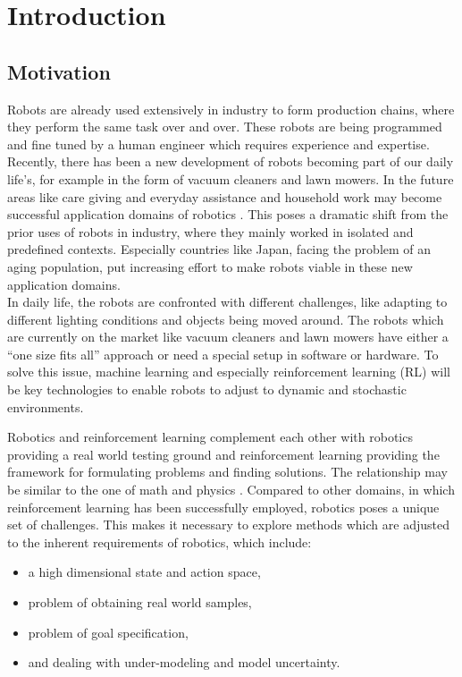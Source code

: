 
\chapter{Introduction}

\section{Motivation}
Robots are already used extensively in industry to form production chains,
where they perform the same task over and over.
These robots are being programmed and fine tuned
by a human engineer which requires experience and expertise. \\
Recently, there has been a new development of robots
becoming part of our daily life's, for example in the form of 
vacuum cleaners and lawn mowers. In the future areas like care giving and
everyday assistance and household work may become successful
application domains
of robotics \citep{schaal2007new}.
This poses a dramatic shift from the prior uses of robots in industry, where
they mainly worked in isolated and predefined contexts.
Especially countries like Japan, facing the problem of an
aging population, put increasing effort to make robots
viable in these new application domains.  \\
In daily life, the robots are confronted with different challenges,
like adapting to different lighting conditions and
objects being moved around.
The robots which are currently on the market
like vacuum cleaners and lawn mowers have
either a ``one size fits all'' approach or need a special setup
in software or hardware. To solve this issue,
machine learning and especially
reinforcement learning (RL) will be key technologies to enable robots
to adjust to dynamic and stochastic environments.

Robotics and reinforcement learning complement each other
with robotics providing a real world testing ground and
reinforcement learning providing
the framework for formulating problems and finding solutions. The 
relationship may be similar to the one of  math and physics
\citep{kober2013reinforcement}. 
Compared to other domains, in which reinforcement learning has been
successfully employed,
robotics poses a unique set of challenges. This makes
it necessary to explore methods which are adjusted to the inherent
requirements of robotics, which include:

\begin{itemize}
\item a high dimensional state and action space,
\item problem of obtaining real world samples,
\item problem of goal specification,
\item and dealing with under-modeling and model uncertainty.
\end{itemize}

